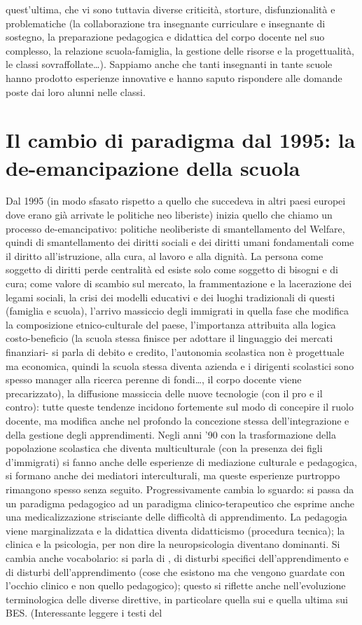quest'ultima, che vi sono tuttavia diverse criticità, storture, disfunzionalità e problematiche (la collaborazione tra insegnante curriculare e insegnante di sostegno, la preparazione pedagogica e didattica del corpo docente nel suo complesso, la relazione scuola-famiglia, la gestione delle risorse e la progettualità, le classi sovraffollate\dots). Sappiamo anche che tanti insegnanti in tante scuole hanno prodotto esperienze innovative e hanno saputo rispondere alle domande poste dai loro alunni nelle classi.
\section*{Il cambio di paradigma dal 1995: la de-emancipazione della scuola}

Dal 1995 (in modo sfasato rispetto a quello che succedeva in altri paesi europei dove erano già arrivate le politiche neo liberiste) inizia quello che chiamo un processo de-emancipativo: politiche neoliberiste di smantellamento del Welfare, quindi di smantellamento dei diritti sociali e dei diritti umani fondamentali come il diritto all'istruzione, alla cura, al lavoro e alla dignità. La persona come soggetto di diritti perde centralità ed esiste solo come soggetto di bisogni e di cura; come valore di scambio sul mercato, la frammentazione e la lacerazione dei legami sociali, la crisi dei modelli educativi e dei luoghi tradizionali di questi (famiglia e scuola), l'arrivo massiccio degli immigrati in quella fase che modifica la composizione etnico-culturale del paese, l'importanza attribuita alla logica costo-beneficio (la scuola stessa finisce per adottare il linguaggio dei mercati finanziari- si parla di debito e credito, l'autonomia scolastica non è progettuale ma economica, quindi la scuola stessa diventa azienda e i dirigenti scolastici sono spesso manager alla ricerca perenne di fondi\dots, il corpo docente viene precarizzato), la diffusione massiccia delle nuove tecnologie (con il pro e il contro): tutte queste tendenze incidono fortemente sul modo di concepire il ruolo docente, ma modifica anche nel profondo la concezione stessa dell'integrazione e della gestione degli apprendimenti. Negli anni '90 con la trasformazione della popolazione scolastica che diventa multiculturale (con la presenza dei figli d'immigrati) si fanno anche delle esperienze di mediazione culturale e pedagogica, si formano anche dei mediatori interculturali, ma queste esperienze purtroppo rimangono spesso senza seguito. Progressivamente cambia lo sguardo: si passa da un paradigma pedagogico ad un paradigma clinico-terapeutico che esprime anche una medicalizzazione strisciante delle difficoltà di apprendimento. La pedagogia viene marginalizzata e la didattica diventa didatticismo (procedura tecnica); la clinica e la psicologia, per non dire la neuropsicologia diventano dominanti. Si cambia anche vocabolario: si parla di , di disturbi specifici dell'apprendimento e di disturbi dell'apprendimento (cose che esistono ma che vengono guardate con l'occhio clinico e non quello pedagogico); questo si riflette anche nell'evoluzione terminologica delle diverse direttive, in particolare quella sui  e quella ultima sui BES. (Interessante leggere i testi del 